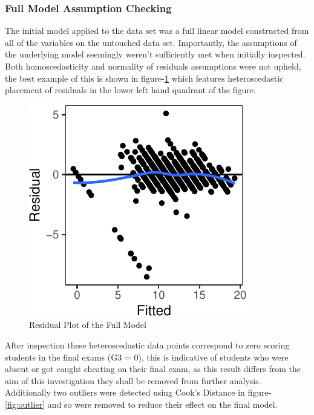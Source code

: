 \documentclass[a4paper,8pt,twocolumn,twoside,]{pinp}
\begin{document}
\hypertarget{full-model-assumption-checking}{%
\subsubsection{Full Model Assumption
Checking}\label{full-model-assumption-checking}}

The initial model applied to the data set was a full linear model
constructed from all of the variables on the untouched data set.
Importantly, the assumptions of the underlying model seemingly weren't
sufficiently met when initially inspected. Both homoscedasticity and
normality of residuals assumptions were not upheld, the best example of
this is shown in figure-\ref{fig:FR} which features heteroscedastic
placement of residuals in the lower left hand quadrant of the figure.

\begin{figure}

{\centering \includegraphics{CC05E4-FinalReport_files/figure-latex/FR-1} 

}

\caption{Residual Plot of the Full Model}\label{fig:FR}
\end{figure}

After inspection these heteroscedastic data points correspond to zero
scoring students in the final exams (G3 = 0), this is indicative of
students who were absent or got caught cheating on their final exam, as
this result differs from the aim of this investigation they shall be
removed from further analysis. Additionally two outliers were detected
using Cook's Distance in figure-\ref{fig:outlier} and so were removed to
reduce their effect on the final model.
\end{document}
